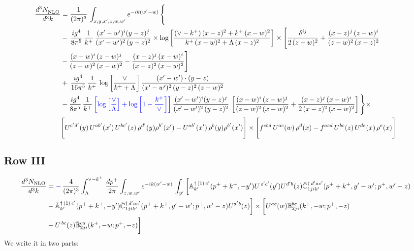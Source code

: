 \documentclass[9pt]{article}
\def\mf#1{\mathbb{#1}}
\numberwithin{equation}{section}
\begin{document}
\begin{align}
     \frac{d^{3}N_{\rm NLO}^{\rm}}{d^{3}k}  & =  \frac{1}{(2\pi)^{3}}\, \int_{x,y,x',z,w,w^{\prime}} e^{-ik(w^{\prime}-w)}\, \Bigg\{\notag \\ & -\,\frac{ig^{4}}{8\pi^{5}}\,\frac{1}{k^{+}}\,\frac{(x'-w')^{i}(y-z)^{j}}{(x'-w')^{2}\,(y-z)^{2}}\times \log{\left[\frac{(\vee-k^{+})\,(x-z)^{2}+k^{+}\,(x-w)^{2}}{k^{+}\,(x-w)^{2}+\Lambda\, (x-z)^{2}}\right]}\times \Bigg[\frac{\delta^{ij}}{2\,(z-w)^{2}}+\frac{(x-z)^{j}\,(z-w)^{i}}{(z-w)^{2}\,(x-z)^{2}}\notag \\ & -\frac{(x-w)^{i}\,(z-w)^{j}}{(z-w)^{2}\,(x-w)^{2}}-\frac{(x-z)^{j}\,(x-w)^{i}}{(x-z)^{2}\,(x-w)^{2}}\Bigg]\notag \\ & +\,\frac{ig^{4}}{16\pi^{5}}\,\frac{1}{k^{+}}\,\log{\left[\frac{\vee}{k^{+}+\Lambda}\right]}\, \frac{(x'-w')\cdot (y-z)}{(x'-w')^{2}\,(y-z)^{2}\,(z-w)^{2}}\notag \\ & -\frac{ig^{4}}{8\pi^{5}}\,\frac{1}{k^{+}}\,{\color{blue}\left[\log{\left[\frac{\vee}{\Lambda}\right]} + \log{\left[1-\frac{k^{+}}{\vee}\right]}\right]}\,\frac{(x'-w')^{i}(y-z)^{j}}{(x'-w')^{2}\,(y-z)^{2}}\,\left[\frac{(x-w)^{i}\,(z-w)^{j}}{(z-w)^{2}\,(x-w)^{2}}+\frac{(x-z)^{j}\,(x-w)^{i}}{2\,(x-z)^{2}\, (x-w)^{2}}\right]\Bigg\}\times \notag \\ & \Bigg[U^{c'd'}(y)\,U^{ab'}(x')\,U^{bc'}(z)\,\rho^{d'}(y)\rho^{b'}(x')-U^{ab'}(x')\,\rho^{b}(y)\rho^{b'}(x')\Bigg]\times\Bigg[f^{cbd}\,U^{ac}(w)\,\rho^{d}(x)-f^{acd}\, U^{bc}(z)\,U^{de}(x)\,\rho^{e}(x)\Bigg]
\end{align}
 \subsection{Row III\,}
 \begin{align}
    \frac{d^{3}N_{\rm NLO}}{d^{3}k} & = {\color{blue}-}\,\frac{4}{(2\pi)^{3}} \int_{\Lambda}^{\vee -k^{+}}\, \frac{dp^{+}}{2\pi}\int_{z,w,w^{\prime}} e^{-ik(w^{\prime}-w)}\,\int_{y^{\prime}}\bigg[\mf{A}^{\dagger\, (1)\,e^{\prime}}_{k^{\prime}}(p^{+}+k^{+},-y^{\prime})U^{\, e^{\prime}c^{\prime}}(y^{\prime})U^{d^{\prime}b}(z) \Bar{\mf{C}}^{\dagger\, d^{\prime}ac^{\prime}}_{1jik^{\prime}}(p^{+}+k^{+},y^{\prime}-w^{\prime}; p^{+},w^{\prime}-z)\notag \\ &  -\Bar{\mf{A}}^{\dagger\, (1)\,c^{\prime}}_{k^{\prime}}(p^{+}+k^{+},-y^{\prime}) \Bar{\mf{C}}^{\dagger\, d^{\prime}ac^{\prime}}_{1jik^{\prime}}(p^{+}+k^{+},y^{\prime}-w^{\prime}; p^{+},w^{\prime}-z)U^{d^{\prime}b}(z)\bigg] \times \bigg[U^{ac}(w) \mf{B}^{bc}_{2ji}(k^{+},-w;p^{+},-z)\notag \\ &  -U^{\, bc}(z)\Bar{\mf{B}}^{ca}_{2ji}(k^{+},-w; p^{+},-z)\bigg]\nonumber
\end{align}
We write it in two parts:
\end{document}
